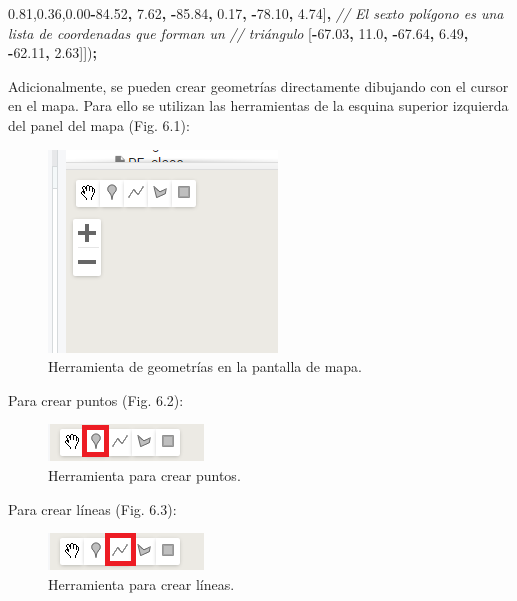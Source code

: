 \documentclass[
  12pt,
  letterpaper,
  twoside]{book}
\newenvironment{Shaded}{\begin{snugshade}}{\end{snugshade}}
\newcommand{\CommentTok}[1]{\textcolor[rgb]{0.56,0.35,0.01}{\textit{#1}}}
\newcommand{\FloatTok}[1]{\textcolor[rgb]{0.00,0.00,0.81}{#1}}
\newcommand{\NormalTok}[1]{#1}
\newcommand{\OperatorTok}[1]{\textcolor[rgb]{0.81,0.36,0.00}{\textbf{#1}}}
\begin{document}
\begin{Shaded}
\begin{Highlighting}[]
\NormalTok{    [}\OperatorTok{{-}}\FloatTok{84.52}\OperatorTok{,} \FloatTok{7.62}\OperatorTok{,}         
     \OperatorTok{{-}}\FloatTok{85.84}\OperatorTok{,} \FloatTok{0.17}\OperatorTok{,}
     \OperatorTok{{-}}\FloatTok{78.10}\OperatorTok{,} \FloatTok{4.74}\NormalTok{]}\OperatorTok{,}
    \CommentTok{// El sexto polígono es una lista de coordenadas que forman un }
    \CommentTok{// triángulo}
\NormalTok{    [}\OperatorTok{{-}}\FloatTok{67.03}\OperatorTok{,} \FloatTok{11.0}\OperatorTok{,}         
     \OperatorTok{{-}}\FloatTok{67.64}\OperatorTok{,} \FloatTok{6.49}\OperatorTok{,}
     \OperatorTok{{-}}\FloatTok{62.11}\OperatorTok{,} \FloatTok{2.63}\NormalTok{]])}\OperatorTok{;}
\end{Highlighting}
\end{Shaded}

Adicionalmente, se pueden crear geometrías directamente dibujando con el cursor en el mapa. Para ello se utilizan las herramientas de la esquina superior izquierda del panel del mapa (Fig. 6.1):

\begin{figure}[btp]

{\centering \includegraphics[width=0.3\linewidth]{Img/geometrias} 

}

\caption{Herramienta de geometrías en la pantalla de mapa.}\label{fig:unnamed-chunk-63}
\end{figure}

Para crear puntos (Fig. 6.2):

\begin{figure}[btp]

{\centering \includegraphics[width=0.2\linewidth]{Img/punto} 

}

\caption{Herramienta para crear puntos.}\label{fig:unnamed-chunk-64}
\end{figure}

Para crear líneas (Fig. 6.3):

\begin{figure}[btp]

{\centering \includegraphics[width=0.2\linewidth]{Img/linea} 

}

\caption{Herramienta para crear líneas.}\label{fig:unnamed-chunk-65}
\end{figure}
\end{document}
